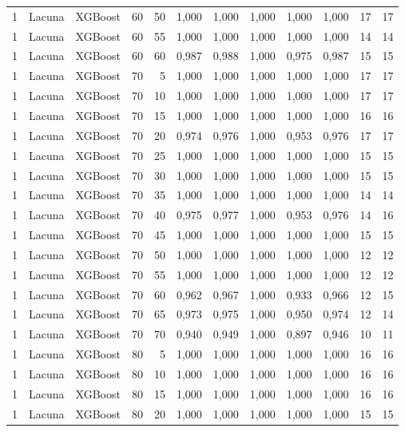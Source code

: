 \begin{longtable}{ccclrrrrrrrr}
1 & Lacuna & XGBoost & 60 & 50 & 1,000 & 1,000 & 1,000 & 1,000 & 1,000 & 17 & 17 \\
1 & Lacuna & XGBoost & 60 & 55 & 1,000 & 1,000 & 1,000 & 1,000 & 1,000 & 14 & 14 \\
1 & Lacuna & XGBoost & 60 & 60 & 0,987 & 0,988 & 1,000 & 0,975 & 0,987 & 15 & 15 \\
1 & Lacuna & XGBoost & 70 & 5 & 1,000 & 1,000 & 1,000 & 1,000 & 1,000 & 17 & 17 \\
1 & Lacuna & XGBoost & 70 & 10 & 1,000 & 1,000 & 1,000 & 1,000 & 1,000 & 17 & 17 \\
1 & Lacuna & XGBoost & 70 & 15 & 1,000 & 1,000 & 1,000 & 1,000 & 1,000 & 16 & 16 \\
1 & Lacuna & XGBoost & 70 & 20 & 0,974 & 0,976 & 1,000 & 0,953 & 0,976 & 17 & 17 \\
1 & Lacuna & XGBoost & 70 & 25 & 1,000 & 1,000 & 1,000 & 1,000 & 1,000 & 15 & 15 \\
1 & Lacuna & XGBoost & 70 & 30 & 1,000 & 1,000 & 1,000 & 1,000 & 1,000 & 15 & 15 \\
1 & Lacuna & XGBoost & 70 & 35 & 1,000 & 1,000 & 1,000 & 1,000 & 1,000 & 14 & 14 \\
1 & Lacuna & XGBoost & 70 & 40 & 0,975 & 0,977 & 1,000 & 0,953 & 0,976 & 14 & 16 \\
1 & Lacuna & XGBoost & 70 & 45 & 1,000 & 1,000 & 1,000 & 1,000 & 1,000 & 15 & 15 \\
1 & Lacuna & XGBoost & 70 & 50 & 1,000 & 1,000 & 1,000 & 1,000 & 1,000 & 12 & 12 \\
1 & Lacuna & XGBoost & 70 & 55 & 1,000 & 1,000 & 1,000 & 1,000 & 1,000 & 12 & 12 \\
1 & Lacuna & XGBoost & 70 & 60 & 0,962 & 0,967 & 1,000 & 0,933 & 0,966 & 12 & 15 \\
1 & Lacuna & XGBoost & 70 & 65 & 0,973 & 0,975 & 1,000 & 0,950 & 0,974 & 12 & 14 \\
1 & Lacuna & XGBoost & 70 & 70 & 0,940 & 0,949 & 1,000 & 0,897 & 0,946 & 10 & 11 \\
1 & Lacuna & XGBoost & 80 & 5 & 1,000 & 1,000 & 1,000 & 1,000 & 1,000 & 16 & 16 \\
1 & Lacuna & XGBoost & 80 & 10 & 1,000 & 1,000 & 1,000 & 1,000 & 1,000 & 16 & 16 \\
1 & Lacuna & XGBoost & 80 & 15 & 1,000 & 1,000 & 1,000 & 1,000 & 1,000 & 16 & 16 \\
1 & Lacuna & XGBoost & 80 & 20 & 1,000 & 1,000 & 1,000 & 1,000 & 1,000 & 15 & 15 \\

\end{longtable}
